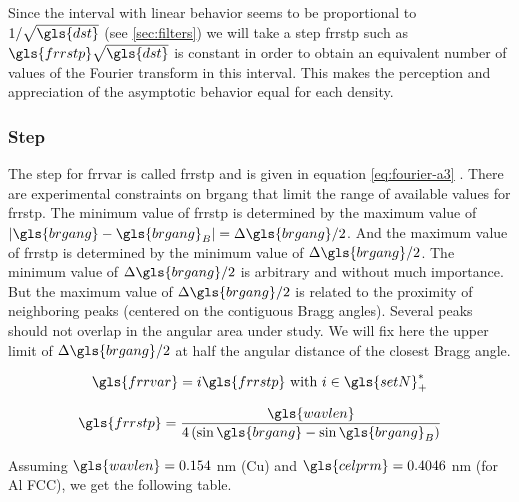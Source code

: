 \medskip

Since the interval with linear behavior seems to be proportional to \( 1 / \sqrt{\gls{dst}} \) (see \ref{sec:filters}) we will take a step \gls{frrstp} such as \( \gls{frrstp} \sqrt{\gls{dst}} \) is constant in order to obtain an equivalent number of values of the Fourier transform in this interval.
This makes the perception and appreciation of the asymptotic behavior equal for each density.

\subsubsection{Step}

The step for \gls{frrvar} is called \gls{frrstp} and is given in equation \eqref{eq:fourier-a3} \cite{W1990}.
There are experimental constraints on \gls{brgang} that limit the range of available values for \gls{frrstp}.
The minimum value of \gls{frrstp} is determined by the maximum value of \( | \gls{brgang} - \gls{brgang}_B | = \Delta \gls{brgang} / 2 \).
And the maximum value of \gls{frrstp} is determined by the minimum value of \( \Delta \gls{brgang} / 2 \).
The minimum value of \( \Delta \gls{brgang} / 2 \) is arbitrary and without much importance.
But the maximum value of \( \Delta \gls{brgang} / 2 \) is related to the proximity of neighboring peaks (centered on the contiguous Bragg angles).
Several peaks should not overlap in the angular area under study.
We will fix here the upper limit of \( \Delta \gls{brgang} / 2 \) at half the angular distance of the closest Bragg angle.

\begin{equation}\label{eq:fourier-L-step}
\gls{frrvar} = i \gls{frrstp} \ \text{with} \ i \in \gls{setN}^*_+
\end{equation}

\begin{equation}\label{eq:fourier-a3}
\gls{frrstp} = \frac{\gls{wavlen}}{4 \left( \sin \gls{brgang} - \sin \gls{brgang}_B \right)}
\end{equation}

\medskip

Assuming \( \gls{wavlen} = 0.154 \) nm (Cu) and \( \gls{celprm} =  0.4046 \) nm  (for Al FCC), we get the following table.

\medskip

